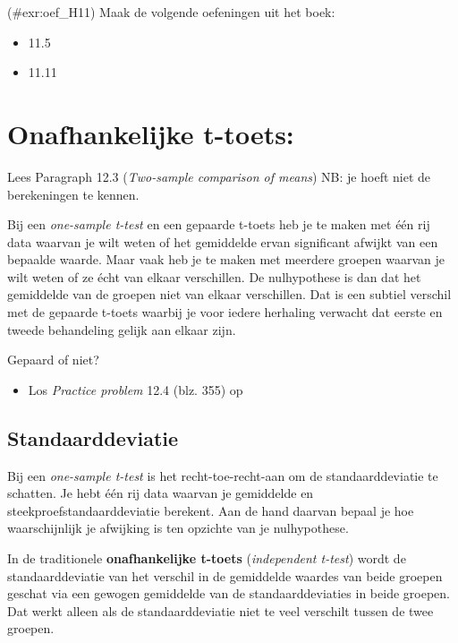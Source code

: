 \documentclass[]{book}
\providecommand{\tightlist}{%
  \setlength{\itemsep}{0pt}\setlength{\parskip}{0pt}}
\theoremstyle{definition}
\theoremstyle{definition}
\theoremstyle{definition}
\theoremstyle{remark}
\let\BeginKnitrBlock\begin \let\EndKnitrBlock\end
\begin{document}
\BeginKnitrBlock{exercise}
\protect\hypertarget{exr:oef_H11}{}{(\#exr:oef\_H11) }Maak de volgende
oefeningen uit het boek:

\begin{itemize}
\tightlist
\item
  11.5
\item
  11.11
\end{itemize}
\EndKnitrBlock{exercise}

\chapter{Onafhankelijke t-toets:}\label{onafhankelijke-t-toets}

\BeginKnitrBlock{ABD}
Lees Paragraph 12.3 (\emph{Two-sample comparison of means}) NB: je hoeft
niet de berekeningen te kennen.
\EndKnitrBlock{ABD}

Bij een \emph{one-sample t-test} en een gepaarde t-toets heb je te maken
met één rij data waarvan je wilt weten of het gemiddelde ervan
significant afwijkt van een bepaalde waarde. Maar vaak heb je te maken
met meerdere groepen waarvan je wilt weten of ze écht van elkaar
verschillen. De nulhypothese is dan dat het gemiddelde van de groepen
niet van elkaar verschillen. Dat is een subtiel verschil met de gepaarde
t-toets waarbij je voor iedere herhaling verwacht dat eerste en tweede
behandeling gelijk aan elkaar zijn.

\BeginKnitrBlock{exercise}
\protect\hypertarget{exr:welnietgepaard}{}{\label{exr:welnietgepaard}
}Gepaard of niet?

\begin{itemize}
\tightlist
\item
  Los \emph{Practice problem} 12.4 (blz. 355) op
\end{itemize}
\EndKnitrBlock{exercise}

\section{Standaarddeviatie}\label{standaarddeviatie}

Bij een \emph{one-sample t-test} is het recht-toe-recht-aan om de
standaarddeviatie te schatten. Je hebt één rij data waarvan je
gemiddelde en steekproefstandaarddeviatie berekent. Aan de hand daarvan
bepaal je hoe waarschijnlijk je afwijking is ten opzichte van je
nulhypothese.

In de traditionele \textbf{onafhankelijke t-toets} (\emph{independent
t-test}) wordt de standaarddeviatie van het verschil in de gemiddelde
waardes van beide groepen geschat via een gewogen gemiddelde van de
standaarddeviaties in beide groepen. Dat werkt alleen als de
standaarddeviatie niet te veel verschilt tussen de twee groepen.
\end{document}
